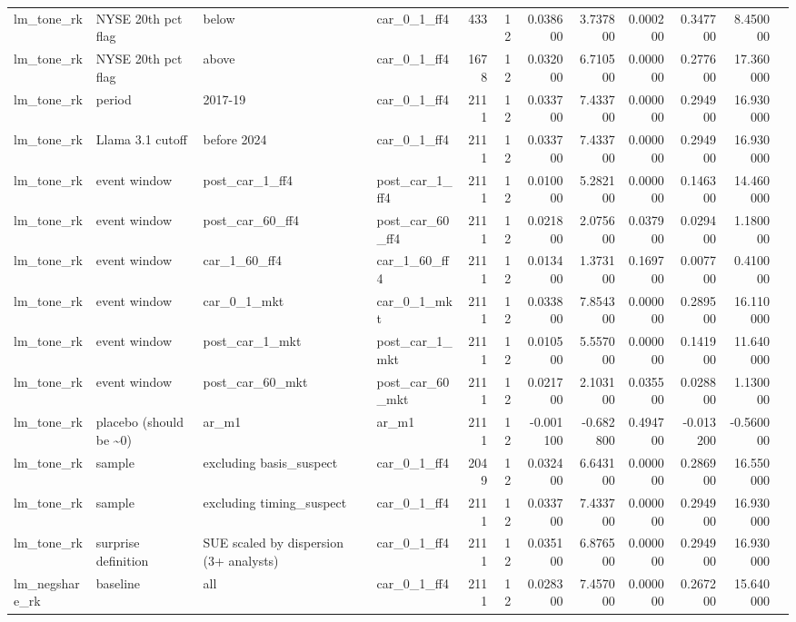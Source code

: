 \begin{table}
\begin{tabular}{llllrrrrrrrl}
lm\_tone\_rk & NYSE 20th pct flag & below & car\_0\_1\_ff4 & 433 & 12 & 0.038600 & 3.737800 & 0.000200 & 0.347700 & 8.450000 &  \\
lm\_tone\_rk & NYSE 20th pct flag & above & car\_0\_1\_ff4 & 1678 & 12 & 0.032000 & 6.710500 & 0.000000 & 0.277600 & 17.360000 &  \\
lm\_tone\_rk & period & 2017-19 & car\_0\_1\_ff4 & 2111 & 12 & 0.033700 & 7.433700 & 0.000000 & 0.294900 & 16.930000 &  \\
lm\_tone\_rk & Llama 3.1 cutoff & before 2024 & car\_0\_1\_ff4 & 2111 & 12 & 0.033700 & 7.433700 & 0.000000 & 0.294900 & 16.930000 &  \\
lm\_tone\_rk & event window & post\_car\_1\_ff4 & post\_car\_1\_ff4 & 2111 & 12 & 0.010000 & 5.282100 & 0.000000 & 0.146300 & 14.460000 &  \\
lm\_tone\_rk & event window & post\_car\_60\_ff4 & post\_car\_60\_ff4 & 2111 & 12 & 0.021800 & 2.075600 & 0.037900 & 0.029400 & 1.180000 &  \\
lm\_tone\_rk & event window & car\_1\_60\_ff4 & car\_1\_60\_ff4 & 2111 & 12 & 0.013400 & 1.373100 & 0.169700 & 0.007700 & 0.410000 &  \\
lm\_tone\_rk & event window & car\_0\_1\_mkt & car\_0\_1\_mkt & 2111 & 12 & 0.033800 & 7.854300 & 0.000000 & 0.289500 & 16.110000 &  \\
lm\_tone\_rk & event window & post\_car\_1\_mkt & post\_car\_1\_mkt & 2111 & 12 & 0.010500 & 5.557000 & 0.000000 & 0.141900 & 11.640000 &  \\
lm\_tone\_rk & event window & post\_car\_60\_mkt & post\_car\_60\_mkt & 2111 & 12 & 0.021700 & 2.103100 & 0.035500 & 0.028800 & 1.130000 &  \\
lm\_tone\_rk & placebo (should be \textasciitilde 0) & ar\_m1 & ar\_m1 & 2111 & 12 & -0.001100 & -0.682800 & 0.494700 & -0.013200 & -0.560000 &  \\
lm\_tone\_rk & sample & excluding basis\_suspect & car\_0\_1\_ff4 & 2049 & 12 & 0.032400 & 6.643100 & 0.000000 & 0.286900 & 16.550000 &  \\
lm\_tone\_rk & sample & excluding timing\_suspect & car\_0\_1\_ff4 & 2111 & 12 & 0.033700 & 7.433700 & 0.000000 & 0.294900 & 16.930000 &  \\
lm\_tone\_rk & surprise definition & SUE scaled by dispersion (3+ analysts) & car\_0\_1\_ff4 & 2111 & 12 & 0.035100 & 6.876500 & 0.000000 & 0.294900 & 16.930000 &  \\
lm\_negshare\_rk & baseline & all & car\_0\_1\_ff4 & 2111 & 12 & 0.028300 & 7.457000 & 0.000000 & 0.267200 & 15.640000 &  \\

\end{tabular}
\end{table}
